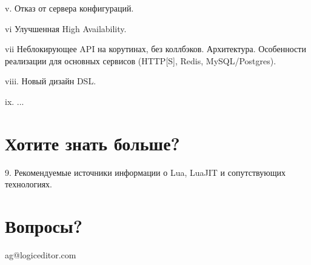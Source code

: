 \documentclass[aspectratio=169,handout]{beamer}
\begin{document}
\begin{frame}
v. Отказ от сервера конфигураций.
\end{frame}

\begin{frame}
vi Улучшенная High Availability.
\end{frame}

\begin{frame}
vii Неблокирующее API на корутинах, без коллбэков. Архитектура. Особенности реализации для основных сервисов (HTTP[S], Redis, MySQL/Postgres).
\end{frame}

\begin{frame}
viii. Новый дизайн DSL.
\end{frame}

\begin{frame}
ix. ...
\end{frame}


\section{Хотите знать больше?}

\begin{frame}
9. Рекомендуемые источники информации о Lua, LuaJIT и сопутствующих технологиях.
\end{frame}


\section{Вопросы?}

\begin{frame}

\begin{center}
ag@logiceditor.com
\end{center}

\end{frame}

\end{document}
